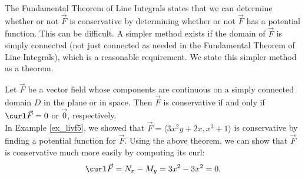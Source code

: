 The Fundamental Theorem of Line Integrals states that we can determine whether or not $\vec F$ is conservative by determining whether or not $\vec F$ has a potential function. This can be difficult. A simpler method exists if the domain of $\vec F$ is simply connected (not just connected as needed in the Fundamental Theorem of Line Integrals), which is a reasonable requirement. We state this simpler method as a theorem.

{Let $\vec F$ be a vector field whose components are continuous on a simply connected domain $D$ in the plane or in space. Then $\vec F$ is conservative if and only if $\curl \vec F = 0$ or $\vec 0$, respectively.
}\\

In Example \ref{ex_livf5}, we showed that $\vec F =\langle 3x^2y+2x,x^3+1\rangle$ is conservative by finding a potential function for $\vec F$. Using the above theorem, we can show that $\vec F$ is conservative much more easily by computing its curl:
$$\curl \vec F = N_x - M_y = 3x^2 - 3x^2 = 0.$$

%
